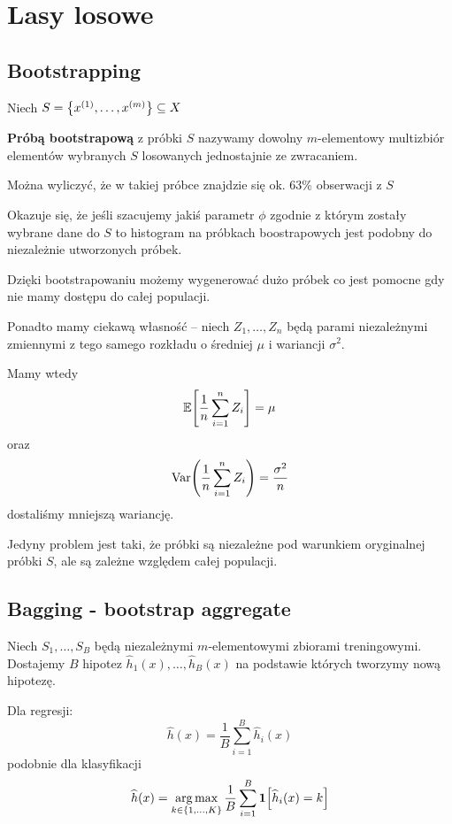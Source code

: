 \section{Lasy losowe}

\subsection{Bootstrapping}
\begin{definition}
Niech \( S = \set{x^{(1)}, \dots, x^{(m)}} \subseteq X \)

\textbf{Próbą bootstrapową} z próbki \( S \) nazywamy dowolny \( m \)-elementowy multizbiór elementów wybranych \( S \) losowanych jednostajnie ze zwracaniem.
\end{definition}

Można wyliczyć, że w takiej próbce znajdzie się ok. 63\% obserwacji z \( S \)

Okazuje się, że jeśli szacujemy jakiś parametr \( \phi \) zgodnie z którym zostały wybrane dane do \( S \) to histogram na próbkach boostrapowych jest podobny do niezależnie utworzonych próbek.

Dzięki bootstrapowaniu możemy wygenerować dużo próbek co jest pomocne gdy nie mamy dostępu do całej populacji.

Ponadto mamy ciekawą własność -- niech \( Z_1, \dots, Z_n \) będą parami niezależnymi zmiennymi z tego samego rozkładu o średniej \( \mu \) i wariancji \( \sigma^2 \).

Mamy wtedy
\[
    \expected{\frac{1}{n}\sum_{i=1}^n Z_i} = \mu
\]
oraz
\[
    \Var\pars{\frac{1}{n}\sum_{i=1}^n Z_i} = \frac{\sigma^2}{n}
\]
dostaliśmy mniejszą wariancję.

Jedyny problem jest taki, że próbki są niezależne pod warunkiem oryginalnej próbki \( S \), ale są zależne względem całej populacji.

\subsection{Bagging - bootstrap aggregate}
Niech \( S_1, \dots, S_B \) będą niezależnymi \( m \)-elementowymi zbiorami treningowymi.
Dostajemy \( B \) hipotez \( \widehat h_1(x), \dots, \widehat h_B(x) \) na podstawie których tworzymy nową hipotezę.

Dla regresji:
\[
    \widehat h(x) = \frac{1}{B} \sum_{i=1}^B \widehat h_i(x)
\]
podobnie dla klasyfikacji
\[
    \widehat h(x) = \argmax_{k \in \set{1, \dots, K}} \frac{1}{B} \sum_{i=1}^B \indicator{\widehat h_i(x) = k}
\]

